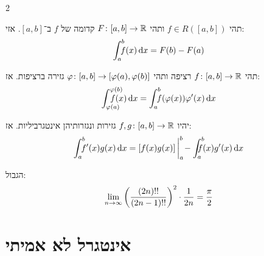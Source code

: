\documentclass[]{../../../tex/classes/styledArticle}
\begin{document}
\begin{multicols}{2}
\begin{Theorem}
			\end{Theorem}
			\begin{Theorem}
				תהי $f \in R([a, b])$ ותהי $F \colon [a, b] \to \mathbb{R}$ קדומה של $f$ ב־$[a, b]$. אזי: 
				\[ \int^{b}_a \!\!\!\!\!\! \ f(x)\,\mathrm{d}x = F(b) - F(a) \]
			\end{Theorem}
			\begin{Theorem}
				תהי $f \colon [a, b] \to \mathbb{R}$ רציפה ותהי $\varphi \colon [a, b] \to [\varphi(a), \varphi(b)]$ גזירה ברציפות. אז: 
				\[ \int^{\phi(b)}_{\phi(a)} \dequadd\ f(x)\dx = \int^{b}_a \dequad \ f(\phi(x))\phi'(x)\dx \]
			\end{Theorem}
			\begin{Theorem}
				יהיו $f, g \colon [a, b] \to \mathbb{R}$ גזירות ונגזרותיהן אינטגרביליות. אז: 
				\[ \int^{b}_a\dequad \ f'(x)g(x)\dx = \csb{f(x)g(x)}\bigg\vert^{b}_a \!- \int^{b}_a\dequad f(x)g'(x)\dx \]
			\end{Theorem}
			\clm{\[ \int^{2\pi}_0 \dequad \sin^{m}x \dx = \begin{cases}
					\frac{\pi}{2} \cdot \frac{(m - 1)!!}{m!!} & m \in \Neven \\
					\frac{(m - 1)!!}{m!! } & m \in \Nodd
				\end{cases} \]}
			\begin{Theorem}[Wallis]
				הגבול:
				\[ \lim_{n \to \infty} \left ( \frac{(2n)!!}{(2n - 1)!!} \right )^{2} \cdot \frac{1}{2n} = \frac{\pi}{2} \]
			\end{Theorem}
			
		\section{אינטגרל לא אמיתי}

\end{multicols}
\end{document}
